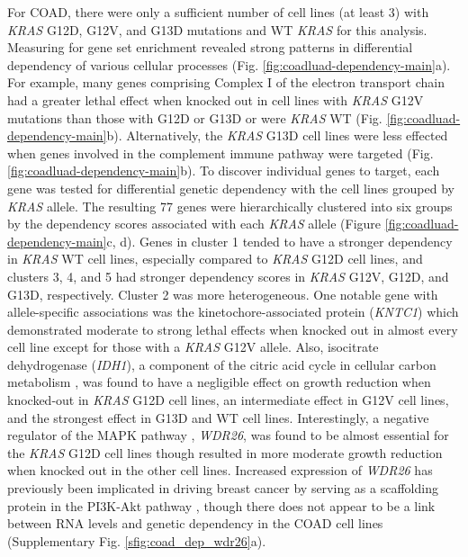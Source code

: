 \documentclass[english, 12pt, letterpaper]{article}
\newcommand{\KRAS}{\emph{KRAS}}
\begin{document}
For COAD, there were only a sufficient number of cell lines (at least 3) with \KRAS{} G12D, G12V, and G13D mutations and WT \KRAS{} for this analysis.
Measuring for gene set enrichment revealed strong patterns in differential dependency of various cellular processes (Fig. \ref{fig:coadluad-dependency-main}a).
For example, many genes comprising Complex I of the electron transport chain had a greater lethal effect when knocked out in cell lines with \KRAS{} G12V mutations than those with G12D or G13D or were \KRAS{} WT (Fig. \ref{fig:coadluad-dependency-main}b).
Alternatively, the \KRAS{} G13D cell lines were less effected when genes involved in the complement immune pathway were targeted (Fig. \ref{fig:coadluad-dependency-main}b).
To discover individual genes to target, each gene was tested for differential genetic dependency with the cell lines grouped by \KRAS{} allele. 
The resulting 77 genes were hierarchically clustered into six groups by the dependency scores associated with each \KRAS{} allele (Figure \ref{fig:coadluad-dependency-main}c, d).
Genes in cluster 1 tended to have a stronger dependency in \KRAS{} WT cell lines, especially compared to \KRAS{} G12D cell lines, and clusters 3, 4, and 5 had stronger dependency scores in \KRAS{} G12V, G12D, and G13D, respectively. Cluster 2 was more heterogeneous.
One notable gene with allele-specific associations was the kinetochore-associated protein (\emph{KNTC1}) which demonstrated moderate to strong lethal effects when knocked out in almost every cell line except for those with a \KRAS{} G12V allele.
Also, isocitrate dehydrogenase (\emph{IDH1}), a component of the citric acid cycle in cellular carbon metabolism \cite{Geisbrecht1999TheDehydrogenase.}, was found to have a negligible effect on growth reduction when knocked-out in \KRAS{} G12D cell lines, an intermediate effect in G12V cell lines, and the strongest effect in G13D and WT cell lines.
Interestingly, a negative regulator of the MAPK pathway \cite{Goto2016WDR26Pathway.}, \emph{WDR26}, was found to be almost essential for the \KRAS{} G12D cell lines though resulted in more moderate growth reduction when knocked out in the other cell lines.
Increased expression of \emph{WDR26} has previously been implicated in driving breast cancer by serving as a scaffolding protein in the PI3K-Akt pathway \cite{Ye2016UpregulatedInvasion.}, though there does not appear to be a link between RNA levels and genetic dependency in the COAD cell lines (Supplementary Fig. \ref{sfig:coad_dep_wdr26}a).
\end{document}
